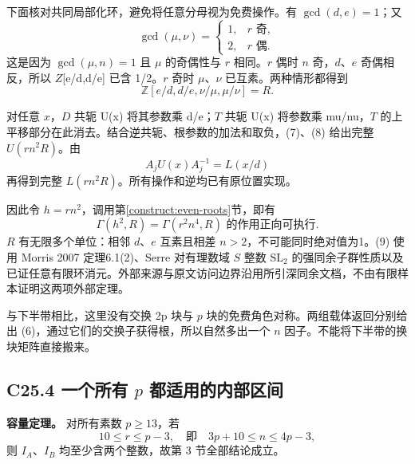 \documentclass[11pt,a4paper]{article}
\theoremstyle{definition}
\numberwithin{equation}{section}
\begin{document}
{下面核对共同局部化环，避免将任意分母视为免费操作。有} {\ensuremath{\operatorname{gcd}(d,e)=1}；又} \[
\gcd(\mu,\nu)=
\begin{cases}1,&r\text{ 奇},\\2,&r\text{ 偶}.\end{cases}
\] {这是因为} {\ensuremath{\operatorname{gcd}(\mu ,n)=1}} {且} {\ensuremath{\mu }} {的奇偶性与} {\ensuremath{r}} {相同。\ensuremath{r}} {偶时} {\ensuremath{n}} {奇，\ensuremath{d}、\ensuremath{e}} {奇偶相反，所以} {\ensuremath{Z}{[}e/d,d/e{]}} {已含} {1/2。\ensuremath{r}} {奇时} {\ensuremath{\mu }、\ensuremath{\nu }} {已互素。两种情形都得到} \[
\mathbb Z[e/d,d/e,\nu/\mu,\mu/\nu]=R.
\tag{C25.8}
\]

{对任意} {\ensuremath{x}，\ensuremath{D}} {共轭} {U(x)} {将其参数乘} {d/e；\ensuremath{T}} {共轭} {U(x)} {将参数乘} {mu/nu，\ensuremath{T}} {的上平移部分在此消去。结合逆共轭、根参数的加法和取负，(7)、(8)} {给出完整} {\ensuremath{U(rn^{2}R)}。由} \[
A_jU(x)A_j^{-1}=L(x/d)
\] {再得到完整} {\ensuremath{L(rn^{2}R)}。所有操作和逆均已有原位置实现。}

{因此令} {\ensuremath{h=rn^{2}}，调用}第\ref{construct:even-roots}节{，即有} \[
\boxed{\Gamma(h^2,R)=\Gamma(r^2n^4,R)
\text{ 的作用正向可执行}.}
\tag{C25.9}
\] {\ensuremath{R}} {有无限多个单位：相邻} {\ensuremath{d}、\ensuremath{e}} {互素且相差} {\ensuremath{n>2}，不可能同时绝对值为1。(9)} {使用} {Morris} {2007} {定理6.1(2)、Serre} {对有理数域} {\ensuremath{S}} {整数} {\ensuremath{\mathrm{SL}_{2}}} {的强同余子群性质以及已证任意有限环消元。外部来源与原文访问边界沿用所引深同余文档，不由有限样本证明这两项外部定理。}

{与下半带相比，这里没有交换} {2p} {块与} {\ensuremath{p}} {块的免费角色对称。两组载体返回分别给出} {(6)，通过它们的交换子获得根，所以自然多出一个} {\ensuremath{n}} {因子。不能将下半带的换块矩阵直接搬来。}

\subsection*{\texorpdfstring{{C25.4} {一个所有} {\ensuremath{p}} {都适用的内部区间}}{C25.4 一个所有  都适用的内部区间}}\label{C25-h157}

\textbf{{容量定理。}} {对所有素数} {\ensuremath{p\ge 13}，若} \[
10\le r\le p-3,
\quad\text{即}\quad
\boxed{3p+10\le n\le4p-3,}
\tag{C25.10}
\] {则} {\ensuremath{I_{A}}、\ensuremath{I_{B}}} {均至少含两个整数，故第} {3} {节全部结论成立。}
\end{document}
